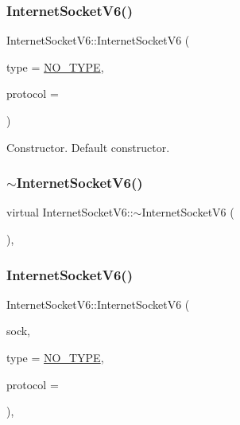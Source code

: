 \subsubsection{\texorpdfstring{Internet\+Socket\+V6()}{InternetSocketV6()}\hspace{0.1cm}{\footnotesize\ttfamily [1/2]}}
{\footnotesize\ttfamily Internet\+Socket\+V6\+::\+Internet\+Socket\+V6 (\begin{DoxyParamCaption}\item[{\hyperlink{classSocketClass_a2182dd9fee09459fabb99e6ae717f595}{Sock\+Type}}]{type = {\ttfamily \hyperlink{classSocketClass_a2182dd9fee09459fabb99e6ae717f595a8c7f955ea5b71498ff1d469345d813ad}{N\+O\+\_\+\+T\+Y\+PE}},  }\item[{int}]{protocol = {} }\end{DoxyParamCaption})\hspace{0.3cm}{\ttfamily [inline]}}

Constructor. Default constructor. \mbox{\label{classInternetSocketV6_aa91c9ad4f01dd5c7a305cc868d46af2c}} 
\subsubsection{\texorpdfstring{$\sim$\+Internet\+Socket\+V6()}{~InternetSocketV6()}}
{\footnotesize\ttfamily virtual Internet\+Socket\+V6\+::$\sim$\+Internet\+Socket\+V6 (\begin{DoxyParamCaption}{ }\end{DoxyParamCaption})\hspace{0.3cm}{\ttfamily [inline]}, {\ttfamily [virtual]}}

\mbox{\label{classInternetSocketV6_a30243b27e0d83abaacd9c8c170fd684b}} 
\subsubsection{\texorpdfstring{Internet\+Socket\+V6()}{InternetSocketV6()}\hspace{0.1cm}{\footnotesize\ttfamily [2/2]}}
{\footnotesize\ttfamily Internet\+Socket\+V6\+::\+Internet\+Socket\+V6 (\begin{DoxyParamCaption}\item[{int}]{sock,  }\item[{\hyperlink{classSocketClass_a2182dd9fee09459fabb99e6ae717f595}{Sock\+Type}}]{type = {\ttfamily \hyperlink{classSocketClass_a2182dd9fee09459fabb99e6ae717f595a8c7f955ea5b71498ff1d469345d813ad}{N\+O\+\_\+\+T\+Y\+PE}},  }\item[{int}]{protocol = {} }\end{DoxyParamCaption})\hspace{0.3cm}{\ttfamily [inline]}, {\ttfamily [protected]}}

